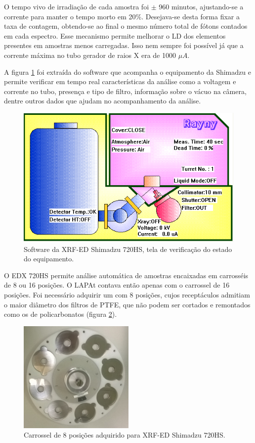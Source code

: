 O tempo vivo de irradiação de cada amostra foi $\pm$ 960 minutos, ajustando-se 
a corrente para manter o tempo morto em 20\%. Desejava-se desta forma fixar a 
taxa de contagem, obtendo-se ao final o mesmo número total de fótons contados 
em cada espectro. Esse mecanismo permite melhorar o LD dos elementos presentes 
em amostras menos carregadas. Isso nem sempre foi possível já que a corrente 
máxima no tubo gerador de raios X era de 1000 $\mu A$. 

A figura \ref{fig:xrfed_software} foi extraída do software que acompanha o 
equipamento da Shimadzu e permite verificar em tempo real características
da análise como a voltagem e corrente no tubo, presença e tipo de filtro, 
informação sobre o vácuo na câmera, dentre outros dados que ajudam no 
acompanhamento da análise. 

\begin{figure}[H]
  \centering
  \includegraphics[scale=0.4]{../inputs/images/edx_iag_monitor.png}
  \caption{Software da XRF-ED Shimadzu 720HS, tela de verificação 
           do estado do equipamento. \label{fig:xrfed_software}}
\end{figure}

O EDX 720HS permite análise automática de amostras encaixadas em carrosséis 
de 8 ou 16 posições. O LAPAt contava então apenas com o carrossel de 16 
posições. Foi necessário adquirir um com 8 posições, cujos receptáculos admitiam
o maior diâmetro dos filtros de PTFE, que não podem ser cortados e remontados 
como os de policarbonatos (figura \ref{fig:carrossel8}).

\begin{figure}[H]
  \centering
  \includegraphics[width=0.5\textwidth]{../inputs/images/carrossel8.jpg}
  \caption{Carrossel de 8 posições adquirido para XRF-ED Shimadzu 720HS. 
           \label{fig:carrossel8}}
\end{figure}


